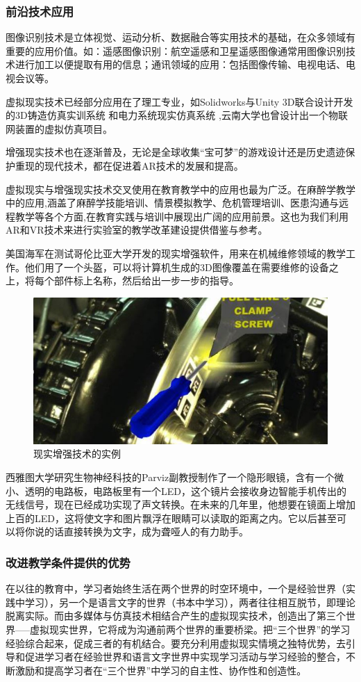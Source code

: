 \documentclass{imutthesis}
\begin{document}
\subsubsection{前沿技术应用}

图像识别技术是立体视觉、运动分析、数据融合等实用技术的基础，在众多领域有重要的应用价值。如：遥感图像识别：航空遥感和卫星遥感图像通常用图像识别技术进行加工以便提取有用的信息；通讯领域的应用：包括图像传输、电视电话、电视会议等。

虚拟现实技术已经部分应用在了理工专业，如Solidworks与Unity 3D联合设计开发的3D铸造仿真实训系统 和电力系统现实仿真系统 ,云南大学也曾设计出一个物联网装置的虚拟仿真项目。

增强现实技术也在逐渐普及，无论是全球收集“宝可梦”的游戏设计还是历史遗迹保护重现的现代技术，都在促进着AR技术的发展和提高。

虚拟现实与增强现实技术交叉使用在教育教学中的应用也最为广泛。在麻醉学教学 中的应用,涵盖了麻醉学技能培训、情景模拟教学、危机管理培训、医患沟通与远程教学等各个方面,在教育实践与培训中展现出广阔的应用前景。这也为我们利用AR和VR技术来进行实验室的教学改革建设提供借鉴与参考。

美国海军在测试哥伦比亚大学开发的现实增强软件，用来在机械维修领域的教学工作。他们用了一个头盔，可以将计算机生成的3D图像覆盖在需要维修的设备之上，将每个部件标上名称，然后给出一步一步的指导。
\begin{figure}[htbp]
    \centering
    \includegraphics{现实.jpg}
    \caption{现实增强技术的实例}
\end{figure}
\newpage
西雅图大学研究生物神经科技的Parviz副教授制作了一个隐形眼镜，含有一个微小、透明的电路板，电路板里有一个LED，这个镜片会接收身边智能手机传出的无线信号，现在已经成功实现了声文转换。在未来的几年里，他想要在镜面上增加上百的LED，这将使文字和图片飘浮在眼睛可以读取的距离之内。它以后甚至可以将你说的话直接转换为文字，成为聋哑人的有力助手。

\subsubsection{改进教学条件提供的优势}
在以往的教育中，学习者始终生活在两个世界的时空环境中，一个是经验世界（实践中学习），另一个是语言文字的世界（书本中学习），两者往往相互脱节，即理论脱离实际。而由多媒体与仿真技术相结合产生的虚拟现实技术，创造出了第三个世界-----虚拟现实世界，它将成为沟通前两个世界的重要桥梁。把“三个世界”的学习经验综合起来，促成三者的有机结合。要充分利用虚拟现实情境之独特优势，去引导和促进学习者在经验世界和语言文字世界中实现学习活动与学习经验的整合，不断激励和提高学习者在“三个世界”中学习的自主性、协作性和创造性。
\end{document}

